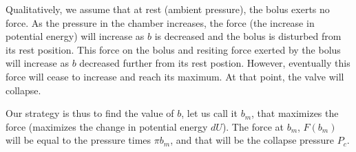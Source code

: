 \documentclass[]{asme2ej}
\begin{document}










Qualitatively, we assume that at rest (ambient pressure), the bolus exerts no force. As the
pressure in the chamber increases, the force (the increase in potential energy) will increase
as $b$ is decreased and the bolus is disturbed from its rest position. This force on the
bolus and resiting force exerted by the bolus will increase
as $b$ decreased further from its rest postion. However, eventually this force will cease to
increase and reach its maximum. At that point, the valve will collapse.

Our strategy is thus to find the value of $b$, let us call it $b_m$, that maximizes the force (maximizes the change in
potential energy $dU$). The force at $b_m$, $F(b_m)$ will be equal to the pressure times $\pi b_m$, and
that will be the collapse pressure $P_c$.
\end{document}
